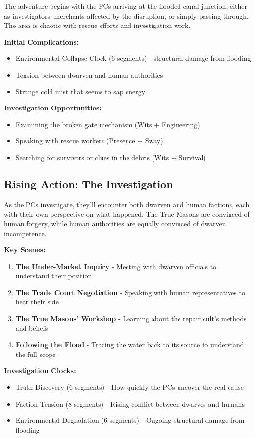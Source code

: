 \documentclass[11pt]{article}
\begin{document}
The adventure begins with the PCs arriving at the flooded canal junction, either as investigators, merchants affected by the disruption, or simply passing through. The area is chaotic with rescue efforts and investigation work.

\textbf{Initial Complications:}
\begin{itemize}
\item Environmental Collapse Clock (6 segments) - structural damage from flooding
\item Tension between dwarven and human authorities
\item Strange cold mist that seems to sap energy
\end{itemize}

\textbf{Investigation Opportunities:}
\begin{itemize}
\item Examining the broken gate mechanism (Wits + Engineering)
\item Speaking with rescue workers (Presence + Sway)
\item Searching for survivors or clues in the debris (Wits + Survival)
\end{itemize}

\subsection{Rising Action: The Investigation}

As the PCs investigate, they'll encounter both dwarven and human factions, each with their own perspective on what happened. The True Masons are convinced of human forgery, while human authorities are equally convinced of dwarven incompetence.

\textbf{Key Scenes:}
\begin{enumerate}
\item \textbf{The Under-Market Inquiry} - Meeting with dwarven officials to understand their position
\item \textbf{The Trade Court Negotiation} - Speaking with human representatives to hear their side
\item \textbf{The True Masons' Workshop} - Learning about the repair cult's methods and beliefs
\item \textbf{Following the Flood} - Tracing the water back to its source to understand the full scope
\end{enumerate}

\textbf{Investigation Clocks:}
\begin{itemize}
\item Truth Discovery (6 segments) - How quickly the PCs uncover the real cause
\item Faction Tension (8 segments) - Rising conflict between dwarves and humans
\item Environmental Degradation (6 segments) - Ongoing structural damage from flooding
\end{itemize}
\end{document}
